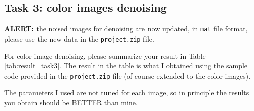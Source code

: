 \documentclass[a4paper,11pt]{article}
\begin{document}
%
%



\subsection{Task 3: color images denoising}

{\color{red} {\bf ALERT:} the noised images for denoising are now updated, in {\tt mat} file format, please use the new data in the {\tt project.zip} file.} 


For color image denoising, please summarize your result in Table \ref{tab:result_task3}. The result in the table is what I obtained using the sample code provided in the {\tt project.zip} file (of course extended to the color images). 

\begin{remark}
The parameters I used are not tuned for each image, so in principle the results you obtain should be BETTER than mine.
\end{remark}
\end{document}
